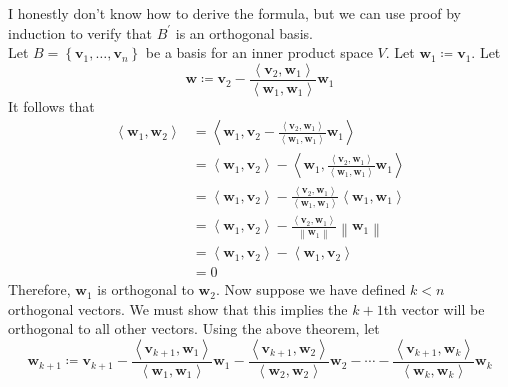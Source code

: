 \begin{longproof}
    I honestly don't know how to derive the formula, but we can use proof by induction to verify that \(B^{\prime} \) is an orthogonal basis.\\
    Let \(B=\left\{ \mathbf{v}_1,\ldots,\mathbf{v}_n \right\} \) be a basis for an inner product space \(V\). Let \(\mathbf{w}_1 \coloneqq \mathbf{v}_1\). Let
    \[
        \mathbf{w}\coloneqq \mathbf{v}_2 -\frac{\left\langle \mathbf{v}_2,\mathbf{w}_1 \right\rangle }{\left\langle \mathbf{w}_1,\mathbf{w}_1 \right\rangle }\mathbf{w}_1
    \]
    It follows that
    \begin{align*}
        \left\langle \mathbf{w}_1,\mathbf{w}_2 \right\rangle &= \left\langle \mathbf{w}_1,\mathbf{v}_2 -\frac{\left\langle \mathbf{v}_2,\mathbf{w}_1 \right\rangle }{\left\langle\mathbf{w}_1,\mathbf{w}_1\right\rangle}\mathbf{w}_1 \right\rangle \\
        &=\left\langle \mathbf{w}_1,\mathbf{v}_2 \right\rangle -\left\langle \mathbf{w}_1,\frac{\left\langle \mathbf{v}_2,\mathbf{w}_1 \right\rangle }{\left\langle\mathbf{w}_1,\mathbf{w}_1\right\rangle}\mathbf{w}_1 \right\rangle \\
        &= \left\langle \mathbf{w}_1,\mathbf{v}_2 \right\rangle -\frac{\left\langle \mathbf{v}_2,\mathbf{w}_1 \right\rangle }{\left\langle\mathbf{w}_1,\mathbf{w}_1\right\rangle}\left\langle \mathbf{w}_1,\mathbf{w}_1 \right\rangle \\
        &= \left\langle \mathbf{w}_1,\mathbf{v}_2 \right\rangle -\frac{\left\langle \mathbf{v}_2,\mathbf{w}_1 \right\rangle}{\left\lVert \mathbf{w}_1 \right\rVert }\left\lVert \mathbf{w}_1 \right\rVert \\
        &=\left\langle \mathbf{w}_1,\mathbf{v}_2 \right\rangle - \left\langle \mathbf{w}_1,\mathbf{v}_2 \right\rangle\\
        &=0
    \end{align*}
    Therefore, \(\mathbf{w}_1\) is orthogonal to \(\mathbf{w}_2\).
    Now suppose we have defined \(k<n\) orthogonal vectors. We must show that this implies the \(k+1\)th vector will be orthogonal to all other vectors. Using the above theorem, let 
    \[
        \mathbf{w}_{k+1}  \coloneqq \mathbf{v}_{k+1} - \frac{\left\langle \mathbf{v}_{k+1},\mathbf{w}_1 \right\rangle }{\left\langle \mathbf{w}_1,\mathbf{w}_1 \right\rangle }\mathbf{w}_1 - \frac{\left\langle \mathbf{v}_{k+1},\mathbf{w}_2 \right\rangle }{\left\langle \mathbf{w}_2,\mathbf{w}_2 \right\rangle }\mathbf{w}_2 -\cdots- \frac{\left\langle \mathbf{v}_{k+1},\mathbf{w}_{k}  \right\rangle }{\left\langle \mathbf{w}_{k},\mathbf{w}_{k}   \right\rangle }\mathbf{w}_{k} 
\]
\end{longproof}

